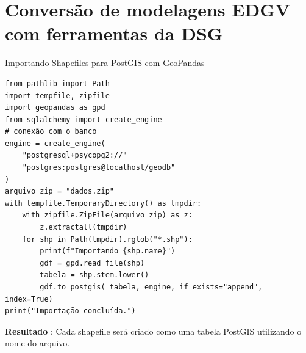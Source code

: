 \documentclass{beamer}
\begin{document}
\section{Conversão de modelagens EDGV com ferramentas da DSG}
\begin{frame}[fragile]{Importando Shapefiles para PostGIS com GeoPandas}

\begin{verbatim}
from pathlib import Path
import tempfile, zipfile 
import geopandas as gpd
from sqlalchemy import create_engine
# conexão com o banco
engine = create_engine(
    "postgresql+psycopg2://"
    "postgres:postgres@localhost/geodb"
)
arquivo_zip = "dados.zip"
with tempfile.TemporaryDirectory() as tmpdir:
    with zipfile.ZipFile(arquivo_zip) as z:
        z.extractall(tmpdir)
    for shp in Path(tmpdir).rglob("*.shp"):
        print(f"Importando {shp.name}")
        gdf = gpd.read_file(shp)
        tabela = shp.stem.lower()
        gdf.to_postgis( tabela, engine, if_exists="append", index=True)
print("Importação concluída.")
\end{verbatim}

\textbf{Resultado} :
Cada shapefile será criado como uma tabela PostGIS utilizando o nome do arquivo.

\end{frame}
\end{document}
